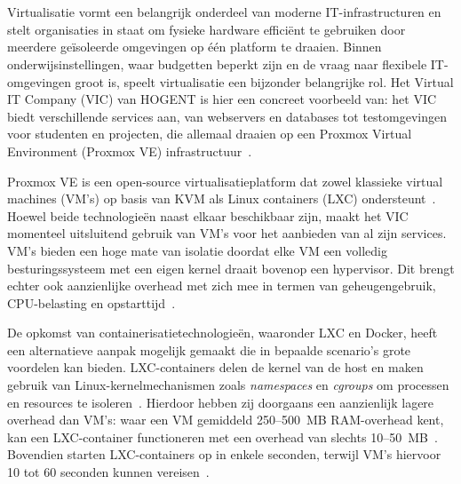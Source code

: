 
\chapter{}%
\label{ch:inleiding}

Virtualisatie vormt een belangrijk onderdeel van moderne IT-infrastructuren en stelt organisaties in staat om fysieke hardware efficiënt te gebruiken door meerdere geïsoleerde omgevingen op één platform te draaien. Binnen onderwijsinstellingen, waar budgetten beperkt zijn en de vraag naar flexibele IT-omgevingen groot is, speelt virtualisatie een bijzonder belangrijke rol. Het Virtual IT Company (VIC) van HOGENT is hier een concreet voorbeeld van: het VIC biedt verschillende services aan, van webservers en databases tot testomgevingen voor studenten en projecten, die allemaal draaien op een Proxmox Virtual Environment (Proxmox VE) infrastructuur~\autocite{ProxmoxDocs}.

Proxmox VE is een open-source virtualisatieplatform dat zowel klassieke virtual machines (VM's) op basis van KVM als Linux containers (LXC) ondersteunt~\autocite{ProxmoxWiki}. Hoewel beide technologieën naast elkaar beschikbaar zijn, maakt het VIC momenteel uitsluitend gebruik van VM's voor het aanbieden van al zijn services. VM's bieden een hoge mate van isolatie doordat elke VM een volledig besturingssysteem met een eigen kernel draait bovenop een hypervisor. Dit brengt echter ook aanzienlijke overhead met zich mee in termen van geheugengebruik, CPU-belasting en opstarttijd~\autocite{Felter2015, Sharma2016}.

De opkomst van containerisatietechnologieën, waaronder LXC en Docker, heeft een alternatieve aanpak mogelijk gemaakt die in bepaalde scenario's grote voordelen kan bieden. LXC-containers delen de kernel van de host en maken gebruik van Linux-kernelmechanismen zoals \textit{namespaces} en \textit{cgroups} om processen en resources te isoleren~\autocite{Merkel2014}. Hierdoor hebben zij doorgaans een aanzienlijk lagere overhead dan VM's: waar een VM gemiddeld 250--500~MB RAM-overhead kent, kan een LXC-container functioneren met een overhead van slechts 10--50~MB~\autocite{LogicWeb2025}. Bovendien starten LXC-containers op in enkele seconden, terwijl VM's hiervoor 10 tot 60 seconden kunnen vereisen~\autocite{TechOpt2025}.

